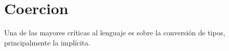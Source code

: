 \chapter{Coercion} %

\label{ch:coercion} %

Una de las mayores críticas al lenguaje es sobre la conversión de tipos, principalmente la implícita.
